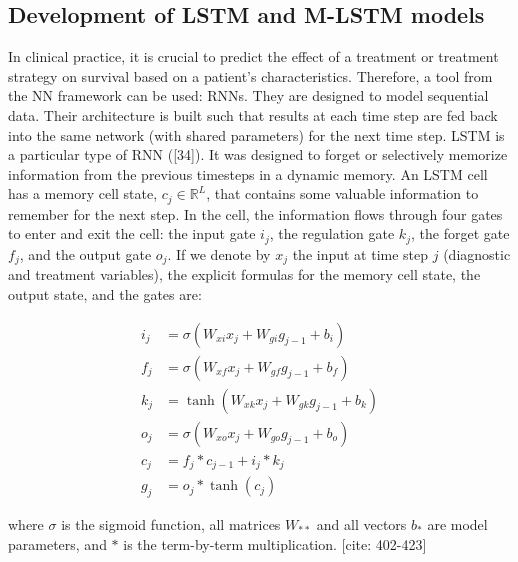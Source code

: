 \documentclass[a4paper,10pt]{article}
\begin{document}
\subsection{Development of LSTM and M-LSTM models}
In clinical practice, it is crucial to predict the effect of a treatment or treatment strategy on survival based on a patient's characteristics. Therefore, a tool from the NN framework can be used: RNNs. They are designed to model sequential data. Their architecture is built such that results at each time step are fed back into the same network (with shared parameters) for the next time step. LSTM is a particular type of RNN ([34]). It was designed to forget or selectively memorize information from the previous timesteps in a dynamic memory. An LSTM cell has a memory cell state, $c_j \in \mathbb{R}^L$, that contains some valuable information to remember for the next step. In the cell, the information flows through four gates to enter and exit the cell: the input gate $i_j$, the regulation gate $k_j$, the forget gate $f_j$, and the output gate $o_j$. If we denote by $x_j$ the input at time step $j$ (diagnostic and treatment variables), the explicit formulas for the memory cell state, the output state, and the gates are:

\begin{align}
i_j &= \sigma(W_{xi}x_j + W_{gi}g_{j-1} + b_i) \\
f_j &= \sigma(W_{xf}x_j + W_{gf}g_{j-1} + b_f) \\
k_j &= \tanh(W_{xk}x_j + W_{gk}g_{j-1} + b_k) \\
o_j &= \sigma(W_{xo}x_j + W_{go}g_{j-1} + b_o) \\
c_j &= f_j * c_{j-1} + i_j * k_j \\
g_j &= o_j * \tanh(c_j)
\end{align}

where $\sigma$ is the sigmoid function, all matrices $W_{**}$ and all vectors $b_*$ are model parameters, and $*$ is the term-by-term multiplication. [cite: 402-423]
\end{document}
